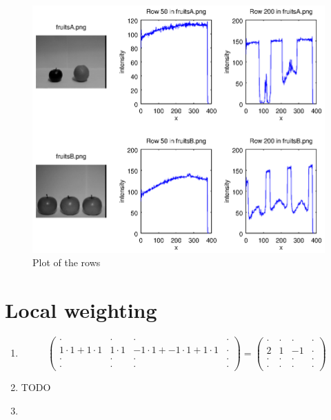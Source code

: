 \documentclass[DIN, pagenumber=false, fontsize=11pt, parskip=half]{scrartcl}
\begin{document}
\begin{enumerate}
\begin{figure}[H]
                \includegraphics[trim = {0 9cm 27cm 0}, clip,width=\textwidth]{Rows}
                \caption{Plot of the rows}
            \end{figure} 
    \end{enumerate}
    \section{Local weighting}
    \begin{enumerate}
        \item
            \begin{equation*}
                \begin{pmatrix}
                    \cdot & \cdot & \cdot & \cdot \\
                    1 \cdot 1 + 1 \cdot 1 & 1 \cdot 1 & -1 \cdot 1 + -1 \cdot 1 + 1 \cdot 1  & \cdot \\
                    \cdot & \cdot & \cdot & \cdot \\
                    \cdot & \cdot & \cdot & \cdot
                \end{pmatrix} =
                \begin{pmatrix}
                    \cdot & \cdot & \cdot & \cdot \\
                    2 & 1 & -1 & \cdot \\
                    \cdot & \cdot & \cdot & \cdot \\
                    \cdot & \cdot & \cdot & \cdot
                \end{pmatrix}
            \end{equation*}
        \item TODO
        \item 
    \end{enumerate}
\end{document}
